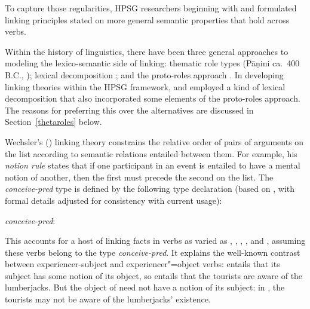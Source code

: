 \documentclass[output=paper
 	        ,biblatex
                ,babelshorthands
                ,newtxmath
                ,draftmode
                ,colorlinks, citecolor=brown
]{langscibook}
\begin{document}
To capture those regularities, HPSG researchers beginning with \citet{Wechsler1995b} and
\citet{Davis1996} formulated linking principles stated on more general semantic properties that hold
across verbs.

Within the history of linguistics, there have been three general approaches to modeling the
lexico-semantic side of linking: thematic role types (P\={a}\d{n}ini ca.\ 400 B.C., \citealt{Fillmore1968}); lexical
decomposition \citep{FoleyandvanValin1984,RappaportandLevin1998}; and the
proto-roles approach
\citep{Dowty1991}.  In developing linking theories within the HPSG framework, \citet{Wechsler1995b}
and \citet{Davis1996} employed a kind of lexical decomposition that also incorporated some elements
of the proto-roles approach.  The reasons for preferring this over the alternatives are discussed in
Section~\ref{thetaroles} below.

Wechsler's (\citeyear{Wechsler1995b}) linking theory constrains the
relative order of pairs of arguments on the \argst list according to semantic relations entailed
between them.  For example, his \emph{notion rule} states
that if one participant in an event is entailed to have a mental notion of another, then the first
must precede the second on the \argst list.  The \textit{conceive-pred} type is defined by the
following type declaration (based on \citealt[127]{Wechsler1995b}, with formal details adjusted for
consistency with current usage):

\begin{exe}
\ex\label{conceive}
\textit{conceive-pred}:\\  
\end{exe}

This accounts for a host of linking facts in verbs as varied as , ,
, , and , assuming these verbs belong to the type
\textit{conceive-pred}.  It explains the well-known contrast between experiencer-subject 
and experiencer"=object  verbs:  entails that its subject has some notion
of its object, so  entails that the tourists are aware of
the lumberjacks.  But the object of  need not have a notion of its subject: in
, the tourists may not be aware of the lumberjacks' existence.
\end{document}
